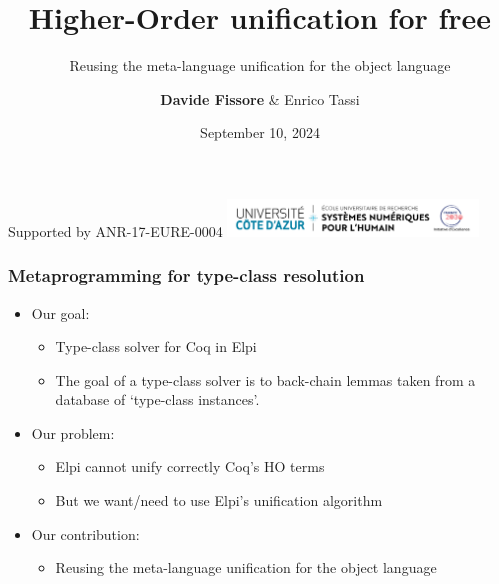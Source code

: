 \documentclass{pres}
\author{\textbf{Davide Fissore} \& Enrico Tassi}
\title{Higher-Order unification for free}
\subtitle{Reusing the meta-language unification for the object language}
\date{September 10, 2024}
\newcommand{\sepFrame}[1]{
  \section{#1}
  \begin{frame}
    \centering
    {\usebeamerfont*{frametitle}\usebeamercolor[fg]{frametitle} #1}
  \end{frame}
}
\begin{document}


\begin{frame}
  \titlepage
  \tiny Supported by ANR-17-EURE-0004 \hfill \includegraphics[height=1cm,valign=c]{UCA_DS4H_France2030.png}
\end{frame}





\begin{frame}[fragile]
  \frametitle{Metaprogramming for type-class resolution}

  \begin{itemize}
    \item Our goal:
          \begin{itemize}
            \item Type-class solver for Coq in Elpi
            \item The goal of a type-class solver is to back-chain lemmas
                  taken from a database of `type-class instances'. 
          \end{itemize}
    \item Our problem:
          \begin{itemize}
            \item Elpi cannot unify correctly Coq's HO terms
            \item But we want/need to use Elpi's unification algorithm
          \end{itemize}
    \item Our contribution:
          \begin{itemize}
            \item Reusing the meta-language unification for the object language
          \end{itemize}
  \end{itemize}

\end{frame}
\end{document}
